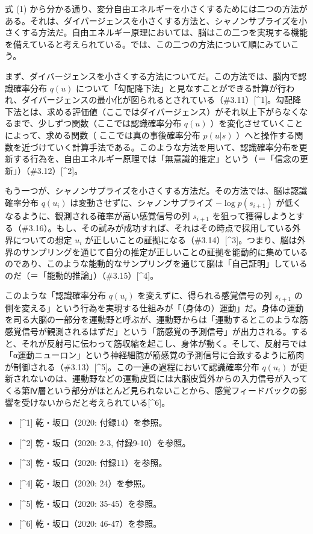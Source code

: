 式 (1)
から分かる通り、変分自由エネルギーを小さくするためには二つの方法がある。それは、ダイバージェンスを小さくする方法と、シャノンサプライズを小さくする方法だ。自由エネルギー原理においては、脳はこの二つを実現する機能を備えていると考えられている。では、この二つの方法について順にみていこう。

まず、ダイバージェンスを小さくする方法についてだ。この方法では、脳内で認識確率分布
\(q(u)\)
について「勾配降下法」と見なすことができる計算が行われ、ダイバージェンスの最小化が図られるとされている（\#3.11）{[}\^{}1{]}。勾配降下法とは、求める評価値（ここではダイバージェンス）がそれ以上下がらなくなるまで、少しずつ関数（ここでは認識確率分布
\(q(u)\) ）を変化させていくことによって、求める関数（
ここでは真の事後確率分布 \(p(u|s)\)
）へと操作する関数を近づけていく計算手法である。このような方法を用いて、認識確率分布を更新する行為を、自由エネルギー原理では「無意識的推定」という（＝「信念の更新」）（\#3.12）{[}\^{}2{]}。

もう一つが、シャノンサプライズを小さくする方法だ。その方法では、脳は認識確率分布
\(q(u_i)\) は変動させずに、シャノンサプライズ \(-\log{p(s_{i+1})}\)
が低くなるように、観測される確率が高い感覚信号の列 \(s_{i+1}\)
を狙って獲得しようとする（\#3.16）。もし、その試みが成功すれば、それはその時点で採用している外界についての想定
\(u_i\)
が正しいことの証拠になる（\#3.14）{[}\^{}3{]}。つまり、脳は外界のサンプリングを通じて自分の推定が正しいことの証拠を能動的に集めているのであり、このような能動的なサンプリングを通じて脳は「自己証明」しているのだ（＝「能動的推論」）（\#3.15）{[}\^{}4{]}。

このような「認識確率分布 \(q(u_i)\) を変えずに、得られる感覚信号の列
\(s_{i+1}\)
の側を変える」という行為を実現する仕組みが「（身体の）運動」だ。身体の運動を司る大脳の一部分を運動野と呼ぶが、運動野からは「運動するとこのような筋感覚信号が観測されるはずだ」という「筋感覚の予測信号」が出力される。すると、それが反射弓に伝わって筋収縮を起こし、身体が動く。そして、反射弓では「α運動ニューロン」という神経細胞が筋感覚の予測信号に合致するように筋肉が制御される（\#3.13）{[}\^{}5{]}。この一連の過程において認識確率分布
\(q(u_i)\)
が更新されないのは、運動野などの運動皮質には大脳皮質外からの入力信号が入ってくる第Ⅳ層という部分がほとんど見られないことから、感覚フィードバックの影響を受けないからだと考えられている{[}\^{}6{]}。

\begin{itemize}
\tightlist
\item
  {[}\^{}1{]} 乾・坂口（2020: 付録14）を参照。
\item
  {[}\^{}2{]} 乾・坂口（2020: 2-3, 付録9-10）を参照。
\item
  {[}\^{}3{]} 乾・坂口（2020: 付録11）を参照。
\item
  {[}\^{}4{]} 乾・坂口（2020: 24）を参照。
\item
  {[}\^{}5{]} 乾・坂口（2020: 35-45）を参照。
\item
  {[}\^{}6{]} 乾・坂口（2020: 46-47）を参照。
\end{itemize}


